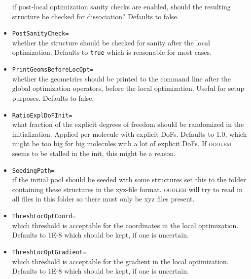 \documentclass[a4paper,10pt]{scrbook}
\newcommand{\ogo}{\textsc{ogolem}}
\begin{document}
\begin{itemize}
	if post-local optimization sanity checks are enabled, should the
resulting structure be checked for dissociation? Defaults to false.
  \item \texttt{PostSanityCheck=}\\
	whether the structure should be checked for sanity after the local
optimization. Defaults to \texttt{true} which is reasonable for most cases.
  \item \texttt{PrintGeomsBeforeLocOpt=}\\
	whether the geometries should be printed to the command line after the
global optimization operators, before the local optimization. Useful for setup
purposes. Defaults to false.
  \item \texttt{RatioExplDoFInit=}\\
	what fraction of the explicit degrees of freedom should be randomized in
the initialization. Applied per molecule with explicit DoFs. Defaults to 1.0,
which might be too big for big molecules with a lot of explicit DoFs. If \ogo{}
seems to be stalled in the init, this might be a reason.
  \item \texttt{SeedingPath=}\\
	if the initial pool should be seeded with some structures set this to
the folder containing these structures in the xyz-file format. \ogo{} will try
to read in all files in this folder so there must only be xyz files present.
  \item \texttt{ThreshLocOptCoord=}\\
	which threshold is acceptable for the coordinates in the local
optimization. Defaults to 1E-8 which should be kept, if one is uncertain.
  \item \texttt{ThreshLocOptGradient=}\\
	which threshold is acceptable for the gradient in the local
optimization. Defaults to 1E-8 which should be kept, if one is uncertain.
\end{itemize}
\end{document}
